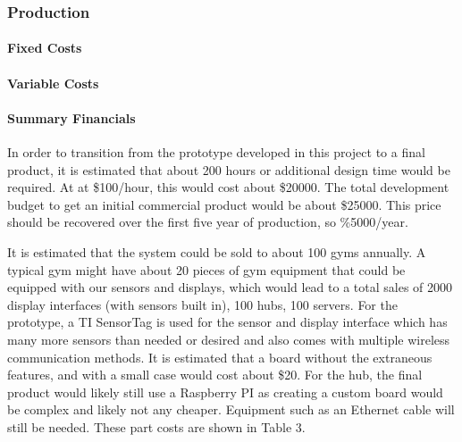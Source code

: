 \documentclass[PPFS.tex]{template/subfiles}
\begin{document}
        \subsubsection{Production}
        \paragraph{Fixed Costs}	%
        \paragraph{Variable Costs}
        \paragraph{Summary Financials}
        
        In order to transition from the prototype developed in this project to a final product, it is estimated that about 200 hours or additional design time would be required. At at \$100/hour, this would cost about \$20000. The total development budget to get an initial commercial product would be about \$25000. This price should be recovered over the first five year of production, so \%5000/year.
        
        It is estimated that the system could be sold to about 100 gyms annually. A typical gym might have about 20 pieces of gym equipment that could be equipped with our sensors and displays, which would lead to a total sales of 2000 display interfaces (with sensors built in), 100 hubs, 100 servers. 
        For the prototype, a TI SensorTag is used for the sensor and display interface which has many more sensors than needed or desired and also comes with multiple wireless communication methods. It is estimated that a board without the extraneous features, and with a small case would cost about \$20.
        For the hub, the final product would likely still use a Raspberry PI as creating a custom board would be complex and likely not any cheaper. Equipment such as an Ethernet cable will still be needed.
        These part costs are shown in Table 3.
        
\end{document}
